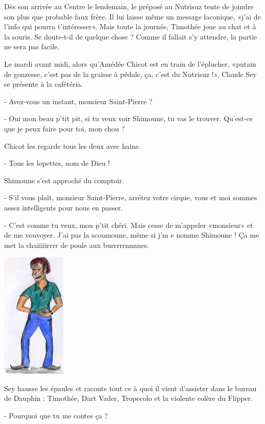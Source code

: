 Dès son arrivée au Centre le lendemain, le préposé au Nutrisuz tente de joindre son plus que probable faux frère. Il lui laisse même un message laconique, «j’ai de l’info qui pourra t’intéresser». Mais toute la journée, Timothée joue au chat et à la souris. Se doute-t-il de quelque chose ? Comme il fallait s’y attendre, la partie ne sera pas facile.

Le mardi avant midi, alors qu’Amédée Chicot est en train de l’éplucher, «putain de gonzesse, c’est pas de la graisse à pédale, ça, c’est du Nutrisuz !», Claude Sey se présente à la cafétéria.

- Avez-vous un instant, monsieur Saint-Pierre ?

- Oui mon beau p’tit pit, si tu veux voir Shimoune, tu vas le trouver. Qu’est-ce que je peux faire pour toi, mon chou ?

Chicot les regarde tous les deux avec haine.

- Tous les lopettes, nom de Dieu !

Shimoune s’est approché du comptoir.

- S’il vous plaît, monsieur Saint-Pierre, arrêtez votre cirque, vous et moi sommes assez intelligents pour nous en passer.

- C’est comme tu veux, mon p’tit chéri. Mais cesse de m’appeler «monsieur» et de me vouvoyer. J’ai pas la scoumoune, même si j’m e nomme Shimoune ! Ça me met la chaiiiiirrrr de poule aux burrrrrnnnnes.

\begin{floatingfigure}[l]{40mm}
\includegraphics[height=60mm]{corps/chapitre13/img/personnage-claude.jpg}
\end{floatingfigure}

Sey hausse les épaules et raconte tout ce à quoi il vient d’assister dans le bureau de Dauphin : Timothée, Dart Vader, Tropecolo et la violente colère du Flipper.

- Pourquoi que tu me contes ça ?

